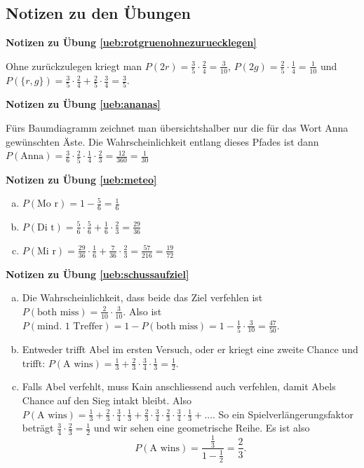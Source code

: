\documentclass[%
<<<<<<< Updated upstream
<<<<<<< Updated upstream
11pt,%
twoside,%
titlepage,%
german,%
=======
=======
>>>>>>> Stashed changes
11pt,%
twoside,%
titlepage,%
swissgerman,%
<<<<<<< Updated upstream
>>>>>>> Stashed changes
=======
>>>>>>> Stashed changes
headsepline%
]{scrartcl}
\newcommand{\faReturnGray}{\textcolor{gray}{\faMailReply}} %
\theoremstyle{definition}
\theoremstyle{plain}
\newcommand{\concatueb}[1]{ueb:#1}%
\newcommand{\concatlsg}[1]{lsg:#1}%
\newenvironment{lsg}[1]{%
    \par\noindent\textbf{Notizen zu Übung \ref{\concatueb{#1}}}\label{\concatlsg{#1}}
    \hfill\hyperref[\concatueb{#1}]{\faReturnGray}\par %
}{%
    \par%
}
\newcommand{\concatueb}[1]{ueb:#1}%
\newcommand{\concatlsg}[1]{lsg:#1}%
\newenvironment{lsg}[1]{%
    \par\noindent\textbf{Notizen zu Übung \ref{\concatueb{#1}}.}%
    \label{\concatlsg{#1}}
}{%
    \par%
}
\begin{document}
\clearpage

\subsection{Notizen zu den \"Ubungen}

\begin{lsg}{rotgruenohnezuruecklegen}
Ohne zur\"uckzulegen kriegt man $P(2r)=\frac{3}{5}\cdot\frac{2}{4}=\frac{3}{10}$, $P(2g)=\frac{2}{5}\cdot\frac{1}{4}=\frac{1}{10}$ und $P(\{r,g\})=\frac{3}{5}\cdot\frac{2}{4}+\frac{2}{5}\cdot\frac{3}{4}=\frac{3}{5}$.
\end{lsg}

\begin{lsg}{ananas}
F\"urs Baumdiagramm zeichnet man \"ubersichtshalber nur die f\"ur das Wort Anna gew\"unschten \"Aste. Die Wahrscheinlichkeit entlang dieses Pfades ist dann $P(\text{Anna})=\frac{3}{6}\cdot\frac{2}{5}\cdot\frac{1}{4}\cdot\frac{2}{3}=\frac{12}{360}=\frac{1}{30}$
\end{lsg}

\begin{lsg}{meteo}
\begin{enumerate}[a)]
\item $P(\text{Mo r})=1-\frac{5}{6}=\frac{1}{6}$
\item $P(\text{Di t})=\frac{5}{6}\cdot\frac{5}{6}+\frac{1}{6}\cdot\frac{2}{3}=\frac{29}{36}$
\item $P(\text{Mi r})=\frac{29}{36}\cdot\frac{1}{6}+\frac{7}{36}\cdot\frac{2}{3}=\frac{57}{216}=\frac{19}{72}$
\end{enumerate}
\end{lsg}

\begin{lsg}{schussaufziel}
\begin{enumerate}[a)]
\item Die Wahrscheinlichkeit, dass beide das Ziel verfehlen ist $P(\text{both miss})=\frac{2}{10}\cdot\frac{3}{10}$. Also ist $P(\text{mind. 1 Treffer})=1-P(\text{both miss})=1-\frac{1}{5}\cdot\frac{3}{10}=\frac{47}{50}$.
\item Entweder trifft Abel im ersten Versuch, oder er kriegt eine zweite Chance und trifft: $P(\text{A wins})=\frac{1}{3}+\frac{2}{3}\cdot\frac{3}{4}\cdot\frac{1}{3}=\frac{1}{2}$.
\item Falls Abel verfehlt, muss Kain anschliessend auch verfehlen, damit Abels Chance auf den Sieg intakt bleibt. Also $P(\text{A wins})=\frac{1}{3}+\frac{2}{3}\cdot\frac{3}{4}\cdot\frac{1}{3}+\frac{2}{3}\cdot\frac{3}{4}\cdot\frac{2}{3}\cdot\frac{3}{4}\cdot\frac{1}{3}+\dots$. So ein \glqq Spielverl\"angerungsfaktor betr\"agt $\frac{3}{4}\cdot\frac{2}{3}=\frac{1}{2}$ und wir sehen eine geometrische Reihe. Es ist also
$$P(\text{A wins})=\frac{\frac{1}{3}}{1-\frac{1}{2}}=\frac{2}{3}.$$
\end{enumerate}
\end{lsg}
\end{document}
